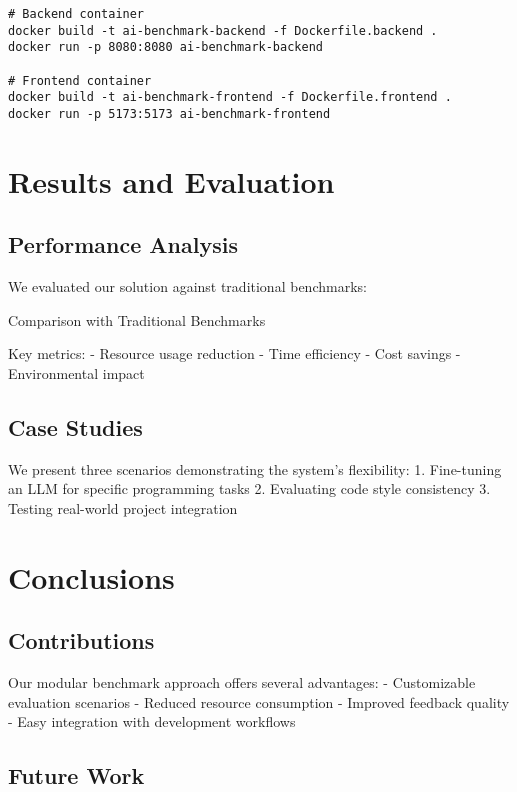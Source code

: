 \begin{verbatim}
# Backend container
docker build -t ai-benchmark-backend -f Dockerfile.backend .
docker run -p 8080:8080 ai-benchmark-backend

# Frontend container
docker build -t ai-benchmark-frontend -f Dockerfile.frontend .
docker run -p 5173:5173 ai-benchmark-frontend
\end{verbatim}

\chapter{Results and Evaluation}

\section{Performance Analysis}

We evaluated our solution against traditional benchmarks:

\begin{table}[h]
    \centering
    \caption{Comparison with Traditional Benchmarks}
    \label{tab:comparison}
\end{table}

Key metrics:
- Resource usage reduction
- Time efficiency
- Cost savings
- Environmental impact

\section{Case Studies}

We present three scenarios demonstrating the system's flexibility:
1. Fine-tuning an LLM for specific programming tasks
2. Evaluating code style consistency
3. Testing real-world project integration

\chapter{Conclusions}

\section{Contributions}

Our modular benchmark approach offers several advantages:
- Customizable evaluation scenarios
- Reduced resource consumption
- Improved feedback quality
- Easy integration with development workflows

\section{Future Work}

